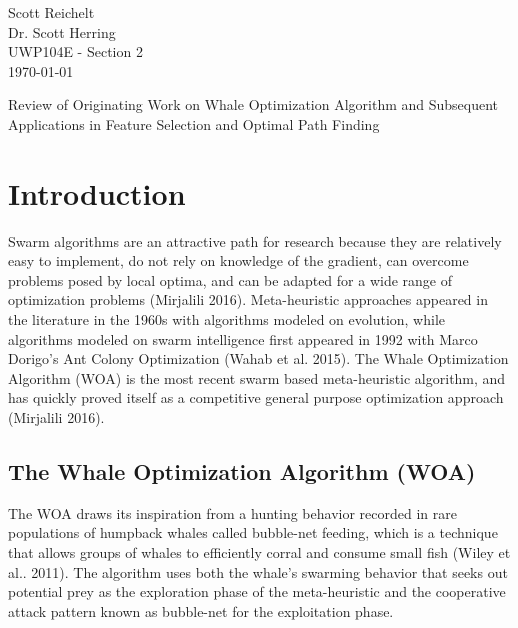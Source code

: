 \documentclass[11pt]{article}
\begin{document}
    \thispagestyle{empty}
    \begin{flushleft}
        Scott Reichelt\\
        Dr. Scott Herring\\
        UWP104E - Section 2\\
        \today\\
    \end{flushleft}
    \vspace{1em}
    \begin{center}
		Review of Originating Work on Whale Optimization Algorithm and Subsequent Applications in Feature Selection and Optimal Path Finding
    \end{center}

\section*{Introduction}
Swarm algorithms are an attractive path for research because they are relatively easy to implement, do not rely on knowledge of the gradient, can overcome problems posed by local optima, and can be adapted for a wide range of optimization problems (Mirjalili 2016).
Meta-heuristic approaches appeared in the literature in the 1960s with algorithms modeled on evolution, while algorithms modeled on swarm intelligence first appeared in 1992 with Marco Dorigo's Ant Colony Optimization (Wahab et al. 2015).
The Whale Optimization Algorithm (WOA) is the most recent swarm based meta-heuristic algorithm, and has quickly proved itself as a competitive general purpose optimization approach (Mirjalili 2016).

\subsection*{The Whale Optimization Algorithm (WOA)}
The WOA draws its inspiration from a hunting behavior recorded in rare populations of humpback whales called bubble-net feeding, which is a technique that allows groups of whales to efficiently corral and consume small fish (Wiley et al.. 2011).
The algorithm uses both the whale's swarming behavior that seeks out potential prey as the exploration phase of the meta-heuristic and the cooperative attack pattern known as bubble-net for the exploitation phase.
\end{document}
